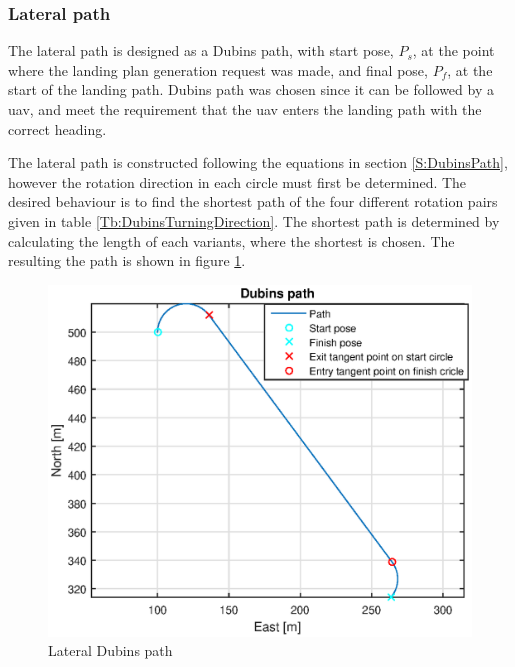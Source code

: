 \subsubsection{Lateral path}
The lateral path is designed as a Dubins path, with start pose, $P_s$, at the point where the landing plan generation request was made, and final pose, $P_f$, at the start of the landing path. Dubins path was chosen since it can be followed by a \gls{uav}, and meet the requirement that the \gls{uav} enters the landing path with the correct heading.

The lateral path is constructed following the equations in section \ref{S:DubinsPath}, however the rotation direction in each circle must first be determined. The desired behaviour is to find the shortest path of the four different rotation pairs given in table \ref{Tb:DubinsTurningDirection}. The shortest path is determined by calculating the length of each variants, where the shortest is chosen. The resulting the path is shown in figure \ref{Fig:LateralPath}.
\begin{figure}[H]
	\centering
		\includegraphics[width=1\textwidth]{figs/SysPlot/DubinsPath.eps}
		\caption{Lateral Dubins path}
		\label{Fig:LateralPath}
\end{figure}

